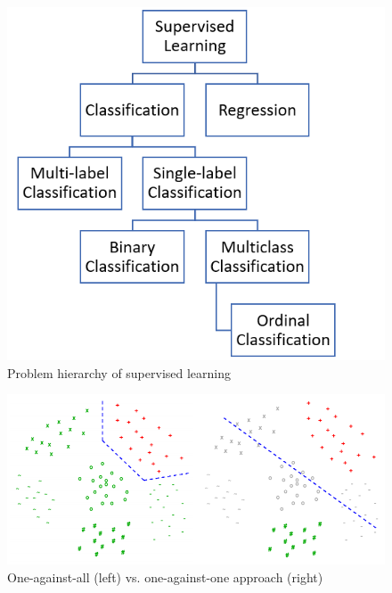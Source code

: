 \documentclass[article,type=msc,colorback,accentcolor=tud7b]{tudthesis}
\begin{document}
    \begin{figure}[H]
      \centering
      \includegraphics{images/problem_hierarchy_supervised_learning}
      \caption{Problem hierarchy of supervised learning}
      \label{fig:problem_hierarchy_supervised_learning}
    \end{figure}

    \begin{figure}[H]
      \centering
      \includegraphics{images/one_against_all_or_one}
      \caption[One-against-all vs. one-against-one approach]{One-against-all (left) vs. one-against-one approach (right)\protect\footnotemark}
      \label{fig:one_against_all_or_one}
    \end{figure}
    
  
\end{document}
